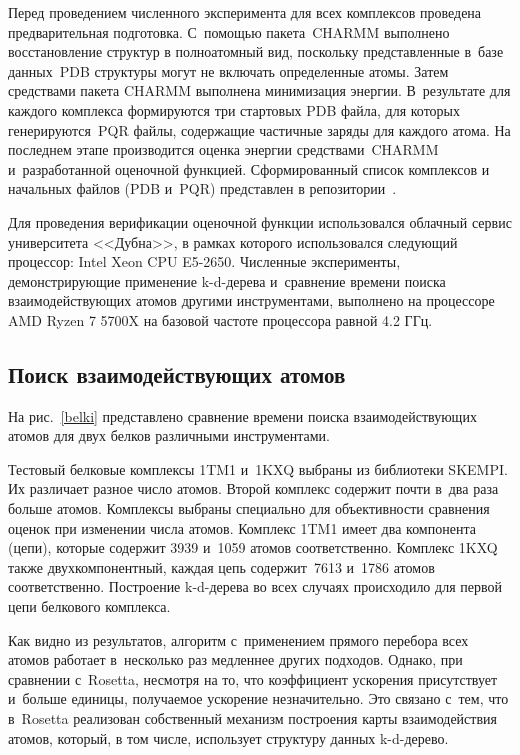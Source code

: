 Перед проведением численного эксперимента для всех комплексов проведена предварительная подготовка. С~помощью пакета~CHARMM выполнено восстановление структур в полноатомный вид, поскольку представленные в~базе данных~PDB структуры могут не включать определенные атомы. Затем средствами пакета CHARMM выполнена минимизация энергии. В~результате для каждого комплекса формируются три стартовых PDB файла, для которых генерируются~PQR файлы, содержащие частичные заряды для каждого атома. На последнем этапе производится оценка энергии средствами~CHARMM и~разработанной оценочной функцией. Сформированный список комплексов и начальных файлов (PDB и~PQR) представлен в репозитории~\cite{vcs}.

Для проведения верификации оценочной функции использовался облачный сервис университета <<Дубна>>, в рамках которого использовался следующий процессор: Intel Xeon CPU E5-2650. Численные эксперименты, демонстрирующие применение k-d-дерева и~сравнение времени поиска взаимодействующих атомов другими инструментами, выполнено на процессоре AMD Ryzen 7 5700X на базовой частоте процессора равной 4.2 ГГц.

\subsection{Поиск взаимодействующих атомов}

На рис.~\ref{belki} представлено сравнение времени поиска взаимодействующих атомов для двух белков различными инструментами. 

Тестовый белковые комплексы 1TM1 и~1KXQ выбраны из библиотеки SKEMPI. Их различает разное число атомов. Второй комплекс содержит почти в~два раза больше атомов. Комплексы выбраны специально для объективности сравнения оценок при изменении числа атомов. Комплекс 1TM1 имеет два компонента (цепи), которые содержит 3939 и~1059 атомов соответственно. Комплекс 1KXQ также двухкомпонентный, каждая цепь содержит~7613 и~1786 атомов соответственно. Построение k-d-дерева во всех случаях происходило для первой цепи белкового комплекса.

Как видно из результатов, алгоритм с~применением прямого перебора всех атомов работает в~несколько раз медленнее других подходов. Однако, при сравнении с~Rosetta, несмотря на то, что коэффициент ускорения присутствует и~больше единицы, получаемое ускорение незначительно. Это связано с~тем, что в~Rosetta реализован собственный механизм построения карты взаимодействия атомов, который, в том числе, использует структуру данных k-d-дерево.


